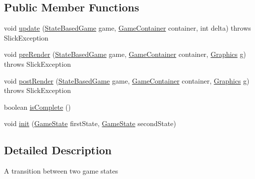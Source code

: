 \subsection*{Public Member Functions}
\begin{DoxyCompactItemize}
\item 
void \mbox{\hyperlink{interfaceorg_1_1newdawn_1_1slick_1_1state_1_1transition_1_1_transition_a9be3072f6e2423e3d0a451a419d1d518}{update}} (\mbox{\hyperlink{classorg_1_1newdawn_1_1slick_1_1state_1_1_state_based_game}{State\+Based\+Game}} game, \mbox{\hyperlink{classorg_1_1newdawn_1_1slick_1_1_game_container}{Game\+Container}} container, int delta)  throws Slick\+Exception
\item 
void \mbox{\hyperlink{interfaceorg_1_1newdawn_1_1slick_1_1state_1_1transition_1_1_transition_ab8b0668c059830d938575d1a0b08bd93}{pre\+Render}} (\mbox{\hyperlink{classorg_1_1newdawn_1_1slick_1_1state_1_1_state_based_game}{State\+Based\+Game}} game, \mbox{\hyperlink{classorg_1_1newdawn_1_1slick_1_1_game_container}{Game\+Container}} container, \mbox{\hyperlink{classorg_1_1newdawn_1_1slick_1_1_graphics}{Graphics}} g)  throws Slick\+Exception
\item 
void \mbox{\hyperlink{interfaceorg_1_1newdawn_1_1slick_1_1state_1_1transition_1_1_transition_ac113f4d5a19962a62a8adec7f9ab5d47}{post\+Render}} (\mbox{\hyperlink{classorg_1_1newdawn_1_1slick_1_1state_1_1_state_based_game}{State\+Based\+Game}} game, \mbox{\hyperlink{classorg_1_1newdawn_1_1slick_1_1_game_container}{Game\+Container}} container, \mbox{\hyperlink{classorg_1_1newdawn_1_1slick_1_1_graphics}{Graphics}} g)  throws Slick\+Exception
\item 
boolean \mbox{\hyperlink{interfaceorg_1_1newdawn_1_1slick_1_1state_1_1transition_1_1_transition_af397d5185cf09c30c3f51d5021d63815}{is\+Complete}} ()
\item 
void \mbox{\hyperlink{interfaceorg_1_1newdawn_1_1slick_1_1state_1_1transition_1_1_transition_a7b59f0c9205f1f0417ee18bc526e5b01}{init}} (\mbox{\hyperlink{interfaceorg_1_1newdawn_1_1slick_1_1state_1_1_game_state}{Game\+State}} first\+State, \mbox{\hyperlink{interfaceorg_1_1newdawn_1_1slick_1_1state_1_1_game_state}{Game\+State}} second\+State)
\end{DoxyCompactItemize}


\subsection{Detailed Description}
A transition between two game states

